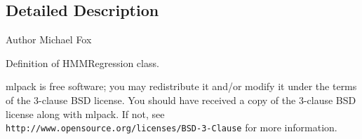 \subsection{Detailed Description}
\begin{DoxyAuthor}{Author}
Michael Fox
\end{DoxyAuthor}
Definition of H\+M\+M\+Regression class.

mlpack is free software; you may redistribute it and/or modify it under the terms of the 3-\/clause B\+SD license. You should have received a copy of the 3-\/clause B\+SD license along with mlpack. If not, see {\tt http\+://www.\+opensource.\+org/licenses/\+B\+S\+D-\/3-\/\+Clause} for more information. 